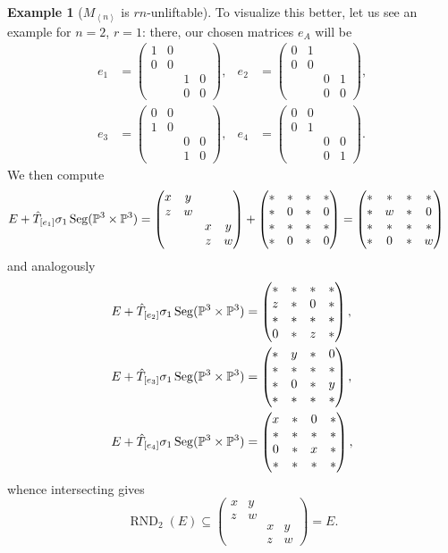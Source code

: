 \documentclass[a4paper,10pt]{article}
\def\gener#1{\left\langle#1\right\rangle}
\def\mtrx#1{\begin{pmatrix}#1\end{pmatrix}}
\DeclareMathOperator{\RND}{RND}
\DeclareMathOperator{\Seg}{Seg}
\theoremstyle{definition}
\newtheorem{example}[theorem]{Example}
\theoremstyle{remark}
\begin{document}
\begin{example}[$M_{\gener n}$ is $rn$-unliftable]
    To visualize this better, let us see an example for $n=2$, $r=1$: there, our chosen matrices $e_A$ will be
    \begin{align*}
        e_1 &= \mtrx{1&0&&\\0&0&&\\&&1&0\\&&0&0}, &
        e_2 &= \mtrx{0&1&&\\0&0&&\\&&0&1\\&&0&0}, \\
        e_3 &= \mtrx{0&0&&\\1&0&&\\&&0&0\\&&1&0}, &
        e_4 &= \mtrx{0&0&&\\0&1&&\\&&0&0\\&&0&1}.
    \end{align*}
    We then compute
    \begin{align*}
        E+\hat T_{[e_1]}\sigma_1\Seg(\pe^3\times\pe^3) &= \mtrx{x&y&&\\z&w&&\\&&x&y\\&&z&w} + \mtrx{*&*&*&*\\ *&0&*&0\\ *&*&*&*\\ *&0&*&0} = \mtrx{*&*&*&*\\ *&w&*&0\\ *&*&*&*\\ *&0&*&w}
    \end{align*}
    and analogously
    \begin{align*}
        E+\hat T_{[e_2]}\sigma_1\Seg(\pe^3\times\pe^3) &= \mtrx{
            *&*&*&*\\
            z&*&0&*\\
            *&*&*&*\\
            0&*&z&*
        },\\
        E+\hat T_{[e_3]}\sigma_1\Seg(\pe^3\times\pe^3) &= \mtrx{
            *&y&*&0\\
            *&*&*&*\\
            *&0&*&y\\
            *&*&*&*
        },\\
        E+\hat T_{[e_4]}\sigma_1\Seg(\pe^3\times\pe^3) &= \mtrx{
            x&*&0&*\\
            *&*&*&*\\
            0&*&x&*\\
            *&*&*&*
        },
    \end{align*}
    whence intersecting gives
    \[
    \RND_2(E) \subseteq
    \mtrx{x&y&&\\z&w&&\\&&x&y\\&&z&w} = E.
    \]
\end{example}
\end{document}
